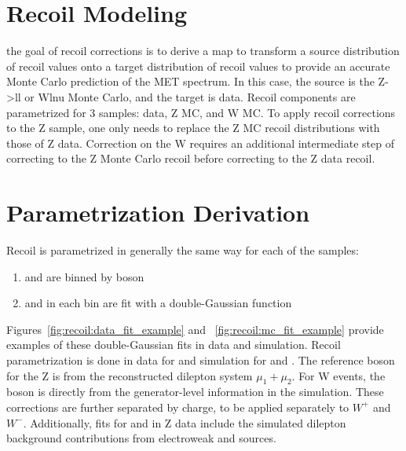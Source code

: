 
\section{Recoil Modeling} \label{ch:recoil:modeling}
the goal of recoil corrections is to derive a map to transform a source distribution of recoil values onto a target distribution of recoil values to provide an accurate Monte Carlo prediction of the MET spectrum. In this case, the source is the Z->ll or Wlnu Monte Carlo, and the target is data. Recoil components are parametrized for 3 samples: data, Z MC, and W MC. To apply recoil corrections to the Z sample, one only needs to replace the Z MC recoil distributions with those of Z data. Correction on the W requires an additional intermediate step of correcting to the Z Monte Carlo recoil before correcting to the Z data recoil.

\section{Parametrization Derivation}
Recoil is parametrized in generally the same way for each of the samples:
\begin{enumerate}
\item \upar and \uprp are binned by boson \pt
\item \upar and \uprp  in each \pt bin are fit with a double-Gaussian function
\end{enumerate}
Figures~\ref{fig:recoil:data_fit_example}
 and ~\ref{fig:recoil:mc_fit_example} provide examples of these double-Gaussian fits in data and simulation. Recoil parametrization is done in data for \zmm and simulation for \zmm and \wmunu. The reference boson \pt for the Z is from the reconstructed dilepton system $\mu_1+\mu_2$. For W events, the boson \pt is directly from the generator-level information in the simulation. These corrections are further separated by charge, to be applied separately to $W^+$ and $W^-$.
Additionally, fits for \upar and \uprp in Z data include the simulated dilepton background contributions from electroweak and \ttbar sources.





